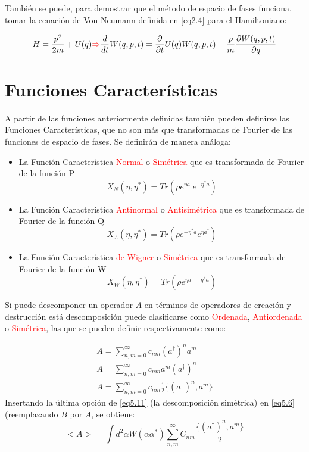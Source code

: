 \documentclass{book}
\begin{document}
También se puede, para demostrar que el método de espacio de fases funciona, tomar la ecuación de Von Neumann definida en \ref{eq2.4} para el Hamiltoniano:

\begin{equation}\label{eq5.7}H=\frac{p^2}{2m}+U(q)\textcolor{red}{\Rightarrow} \frac{d}{dt}W(q,p,t)=\frac{\partial}{\partial t} U(q)W(q,p,t)-\frac{p}{m}\frac{\partial W(q,p,t)}{\partial q}\end{equation}

\section{Funciones Características}

A partir de las funciones anteriormente definidas también pueden definirse las Funciones Características, que no son más que transformadas de Fourier de las funciones de espacio de fases. Se definirán de manera análoga:

\begin{itemize}
    \item La Función Característica \textcolor{red}{Normal} o \textcolor{red}{Simétrica} que es transformada de Fourier de la función P
    \begin{equation}\label{eq5.8}X_N(\eta,\eta^*)=Tr(\rho e^{\eta a^\dag}e^{-\eta^* a})\end{equation}
    \item La Función Característica \textcolor{red}{Antinormal} o \textcolor{red}{Antisimétrica} que es transformada de Fourier de la función Q
    \begin{equation}\label{eq5.9}X_A(\eta,\eta^*)=Tr(\rho e^{-\eta^* a}e^{\eta a^\dag})\end{equation}
    \item La Función Característica \textcolor{red}{de Wigner} o \textcolor{red}{Simétrica} que es transformada de Fourier de la función W
    \begin{equation}\label{eq5.10}X_W(\eta,\eta^*)=Tr(\rho e^{\eta a^\dag -\eta^* a})\end{equation}
\end{itemize}    
Si puede descomponer un operador $A$ en términos de operadores de creación y destrucción está descomposición puede clasificarse como \textcolor{red}{Ordenada}, \textcolor{red}{Antiordenada} o \textcolor{red}{Simétrica}, las que se pueden definir respectivamente como:

\begin{equation}\label{eq5.11}
    \begin{aligned}
    A=\sum_{n,m=0}^\infty c_{nm}(a^\dag)^na^m\\
    A=\sum_{n,m=0}^\infty c_{nm}a^m(a^\dag)^n\\
    A=\sum_{n,m=0}^\infty c_{nm}\frac{1}{2}\{(a^\dag)^n,a^m\}\end{aligned}
\end{equation}   
Insertando la última opción de \ref{eq5.11} (la descomposición simétrica) en \ref{eq5.6} (reemplazando $B$ por $A$, se obtiene:
\begin{equation}\label{eq5.12}<A>=\int d^2 \alpha W(\alpha\alpha^*)\sum_{n,m}^\infty C_{nm}\frac{\{(a^\dag)^n,a^m\}}{2}\end{equation}
\end{document}
